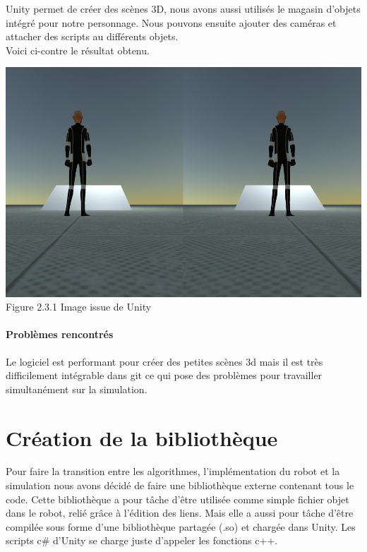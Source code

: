 \documentclass[12pt,a4paper]{report}
\begin{document}
Unity permet de créer des scènes 3D, nous avons aussi utilisés le magasin d'objets intégré pour notre personnage. Nous pouvons ensuite ajouter des caméras et attacher des scripts au différents objets.\\
Voici ci-contre le résultat obtenu.

	\begin{center}
		\includegraphics[scale=0.5]{Screenshot_skybox.png}
		Figure 2.3.1 Image issue de Unity\\
	\end{center}
 	
\paragraph{Problèmes rencontrés}
Le logiciel est performant pour créer des petites scènes 3d mais il est très difficilement intégrable dans git ce qui pose des problèmes pour travailler simultanément sur la simulation.

\section{Création de la bibliothèque}
Pour faire la transition entre les algorithmes, l'implémentation du robot et la simulation nous avons décidé de faire une bibliothèque externe contenant tous le code.
Cette bibliothèque a pour tâche d'être utilisée comme simple fichier objet dans le robot, relié grâce à l'édition des liens. Mais elle a aussi pour tâche d'être compilée sous forme d'une bibliothèque partagée (.so) et chargée dans Unity. Les scripts c\# d'Unity se charge juste d'appeler les fonctions c++.
\end{document}
